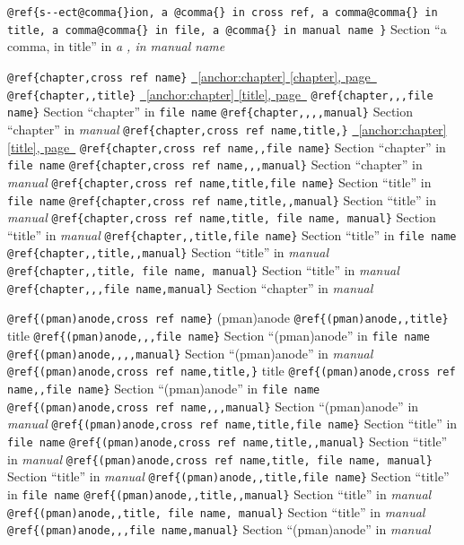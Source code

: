 \documentclass{book}
\begin{document}
\begin{titlepage}
\texttt{@ref\{s{-}{-}ect@comma\{\}ion,\ a @comma\{\} in cross
ref,\ a comma@comma\{\} in title,\ a comma@comma\{\} in file,\ a @comma\{\} in manual name \}}
Section ``a comma, in title'' in \textsl{a , in manual name}

\texttt{@ref\{chapter,cross ref name\}} \hyperref[anchor:chapter]{\chaptername~\ref*{anchor:chapter} [chapter], page~\pageref*{anchor:chapter}}
\texttt{@ref\{chapter{,}{,}title\}} \hyperref[anchor:chapter]{\chaptername~\ref*{anchor:chapter} [title], page~\pageref*{anchor:chapter}}
\texttt{@ref\{chapter{,}{,},file name\}} Section ``chapter'' in \texttt{file name}
\texttt{@ref\{chapter{,}{,}{,}{,}manual\}} Section ``chapter'' in \textsl{manual}
\texttt{@ref\{chapter,cross ref name,title,\}} \hyperref[anchor:chapter]{\chaptername~\ref*{anchor:chapter} [title], page~\pageref*{anchor:chapter}}
\texttt{@ref\{chapter,cross ref name{,}{,}file name\}} Section ``chapter'' in \texttt{file name}
\texttt{@ref\{chapter,cross ref name{,}{,},manual\}} Section ``chapter'' in \textsl{manual}
\texttt{@ref\{chapter,cross ref name,title,file name\}} Section ``title'' in \texttt{file name}
\texttt{@ref\{chapter,cross ref name,title{,}{,}manual\}} Section ``title'' in \textsl{manual}
\texttt{@ref\{chapter,cross ref name,title,\ file name,\ manual\}} Section ``title'' in \textsl{manual}
\texttt{@ref\{chapter{,}{,}title,file name\}} Section ``title'' in \texttt{file name}
\texttt{@ref\{chapter{,}{,}title{,}{,}manual\}} Section ``title'' in \textsl{manual}
\texttt{@ref\{chapter{,}{,}title,\ file name,\ manual\}} Section ``title'' in \textsl{manual}
\texttt{@ref\{chapter{,}{,},file name,manual\}} Section ``chapter'' in \textsl{manual}


\texttt{@ref\{(pman)anode,cross ref name\}} (pman)anode
\texttt{@ref\{(pman)anode{,}{,}title\}} title
\texttt{@ref\{(pman)anode{,}{,},file name\}} Section ``(pman)anode'' in \texttt{file name}
\texttt{@ref\{(pman)anode{,}{,}{,}{,}manual\}} Section ``(pman)anode'' in \textsl{manual}
\texttt{@ref\{(pman)anode,cross ref name,title,\}} title
\texttt{@ref\{(pman)anode,cross ref name{,}{,}file name\}} Section ``(pman)anode'' in \texttt{file name}
\texttt{@ref\{(pman)anode,cross ref name{,}{,},manual\}} Section ``(pman)anode'' in \textsl{manual}
\texttt{@ref\{(pman)anode,cross ref name,title,file name\}} Section ``title'' in \texttt{file name}
\texttt{@ref\{(pman)anode,cross ref name,title{,}{,}manual\}} Section ``title'' in \textsl{manual}
\texttt{@ref\{(pman)anode,cross ref name,title,\ file name,\ manual\}} Section ``title'' in \textsl{manual}
\texttt{@ref\{(pman)anode{,}{,}title,file name\}} Section ``title'' in \texttt{file name}
\texttt{@ref\{(pman)anode{,}{,}title{,}{,}manual\}} Section ``title'' in \textsl{manual}
\texttt{@ref\{(pman)anode{,}{,}title,\ file name,\ manual\}} Section ``title'' in \textsl{manual}
\texttt{@ref\{(pman)anode{,}{,},file name,manual\}} Section ``(pman)anode'' in \textsl{manual}



\end{titlepage}
\end{document}
